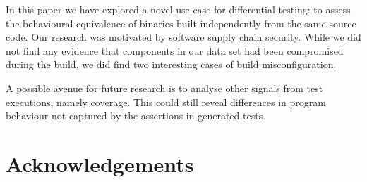 \documentclass[conference]{IEEEtran}
\begin{document}
In this paper we have explored a novel use case for differential testing: to assess the behavioural equivalence of binaries built independently from the same source code. Our research was motivated by software supply chain security. While we did not find any evidence that components in our data set had been compromised during the build, we did find two interesting cases of build misconfiguration.  

A possible avenue for future research is to analyse other signals from test executions, namely coverage. This could still reveal differences in program behaviour not captured by the assertions in generated tests. 

\section*{Acknowledgements}




\end{document}
